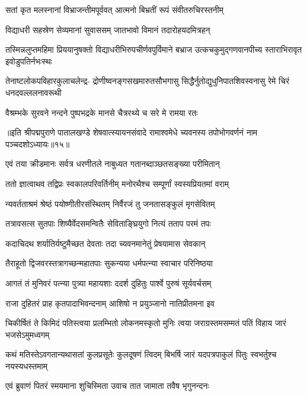 \twolineshloka
{सतां कृत मलस्नानां विभ्राजन्तीमपूर्ववत्}
{आत्मनो बिभ्रतीं रूपं संवीतरुचिरस्तनीम्}%

\twolineshloka
{विद्याधरी सहस्रेण सेव्यमानां सुवाससम्}
{जातभावो विमानं तदारोहयदमित्रहन्}%

\fourlineindentedshloka
{तस्मिन्नलुप्तमहिमा प्रिययानुषक्तो}
{विद्याधरीभिरुपचीर्णवपुर्विमाने}
{बभ्राज उत्कचकुमुद्गणवानपीच्य}
{स्ताराभिरावृत इवोडुपतिर्नभःस्थः}%

\fourlineindentedshloka
{तेनाष्टलोकपविहारकुलाचलेन्द्र-}
{द्रोणीष्वनङ्गसखमारुतसौभगासु}
{सिद्धैर्नुतोद्युधुनिपातशिवस्वनासु}
{रेमे चिरं धनदवल्ललनावरूथी}%

\twolineshloka
{वैश्रम्भके सुरवने नन्दने पुष्पभद्रके}
{मानसे चैत्ररथ्ये च सरे मे रामया रतः}%

{॥इति श्रीपद्मपुराणे पातालखण्डे शेषवात्स्यायनसंवादे रामाश्वमेधे च्यवनस्य तपोभोगवर्णनं नाम पञ्चदशोऽध्यायः॥१५॥}



\twolineshloka
{एवं तया क्रीडमानः सर्वत्र धरणीतले}
{नाबुध्यत गतानब्दाञ्छतसङ्ख्या परीमितान्}%

\twolineshloka
{ततो ज्ञात्वाथव तद्विप्रः स्वकालपरिवर्तिनीम्}
{मनोरथैश्च सम्पूर्णां स्वस्यप्रियतमां वराम्}%

\twolineshloka
{न्यवर्तताश्रमं श्रेष्ठं पयोष्णीतीरसंस्थितम्}
{निर्वैरजं तु जनतासङ्कुलं मृगसेवितम्}%

\twolineshloka
{तत्रावसत्स सुतपाः शिष्यैर्वेदसमन्वितैः}
{सेविताङ्घ्रियुगो नित्यं तताप परमं तपः}%

\twolineshloka
{कदाचिदथ शर्यातिर्यष्टुमैच्छत देवताः}
{तदा च्यवनमानेतुं प्रेषयामास सेवकान्}%

\twolineshloka
{तैराहूतो द्विजवरस्तत्रागच्छन्महातपाः}
{सुकन्यया धर्मपत्न्या स्वाचार परिनिष्ठया}%

\twolineshloka
{आगतं तं मुनिवरं पत्न्या पुत्र्या महायशाः}
{ददर्श दुहितुः पार्श्वे पुरुषं सूर्यवर्चसम्}%

\twolineshloka
{राजा दुहितरं प्राह कृतपादाभिवन्दनाम्}
{आशिषो न प्रयुञ्जानो नातिप्रीतमना इव}%

\fourlineindentedshloka
{चिकीर्षितं ते किमिदं पतिस्त्वया}
{प्रलम्भितो लोकनमस्कृतो मुनिः}
{त्वया जराग्रस्तमसम्मतं पतिं}
{विहाय जारं भजसेऽमुमध्वगम्}%

\twolineshloka
{कथं मतिस्तेऽवगतान्यथासतां कुलप्रसूतेः कुलदूषणं त्विदम्}
{बिभर्षि जारं यदपत्रपाकुलं पितुः स्वभर्तुश्च नयस्यधस्तमाम्}%

\twolineshloka
{एवं ब्रुवाणं पितरं स्मयमाना शुचिस्मिता}
{उवाच तात जामाता तवैष भृगुनन्दनः}%

